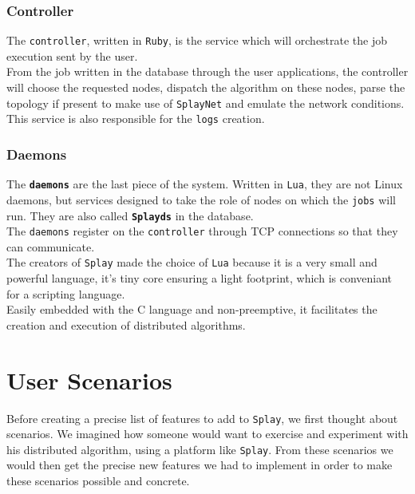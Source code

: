 \documentclass{eplmastersthesis}
\begin{document}
        \subsubsection{Controller}

          The \texttt{controller}, written in \texttt{Ruby}, is the service
          which will orchestrate the job execution sent by the user.\\
          From the job written in the database through the user applications,
          the controller will choose the requested nodes, dispatch the
          algorithm on these nodes, parse the topology if present to make
          use of \texttt{SplayNet} and emulate the network conditions.\\ %
          This service is also responsible for the \texttt{logs} %
          creation.

        \subsubsection{Daemons}

          The \textbf{\texttt{daemons}} are the last piece of the system.
          Written in \texttt{Lua}, they are not Linux daemons, but services designed
          to take the role of nodes on which the \texttt{jobs} will
          run. They are also called \textbf{\texttt{Splayds}} in the
          database.\\
          The \texttt{daemons} register on the %
          \texttt{controller} through TCP connections so that they
          can communicate.\\

          The creators of \texttt{Splay} made the choice of \texttt{Lua} because it is a very
          small and powerful language, it's tiny core ensuring a light
          footprint, which is conveniant for a scripting language.\\
          Easily embedded with the C language and non-preemptive, it
          facilitates the creation and execution of distributed algorithms.

    \section{User Scenarios}

      Before creating a precise list of features to add to \texttt{Splay}, we first
      thought about scenarios. We imagined how someone would want to exercise
      and experiment with his distributed algorithm, using a platform like
      \texttt{Splay}. From these scenarios we would then get the precise new features
      we had to implement in order to make these scenarios possible and
      concrete.\\
\end{document}
